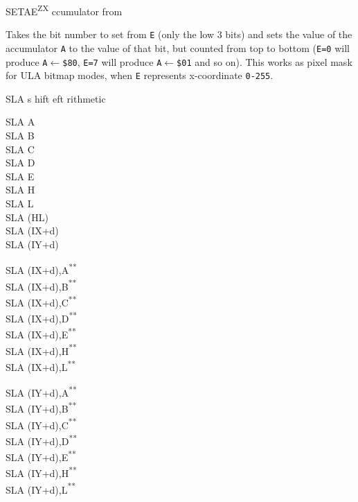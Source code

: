 \documentclass[12pt,twoside,openright,a4paper]{book}
\newcommand{\UNDOC}{\textnormal{\textsuperscript{**}}}
\newcommand{\ZXN}{\textnormal{\textsuperscript{ZX}}}
\begin{document}
\begin{basedescript}{
	\desclabelstyle{\multilinelabel}
	\desclabelwidth{3cm}}
	\begin{DetailItem}{SETAE\ZXN}
		{ ccumulator from }
		{\SymSETAE}

		Takes the bit number to set from {\tt E} (only the low 3 bits) and sets the value of the accumulator {\tt A} to the value of that bit, but counted from top to bottom ({\tt E=0} will produce {\tt A$\leftarrow$\$80}, {\tt E=7} will produce {\tt A$\leftarrow$\$01} and so on). This works as pixel mask for ULA bitmap modes, when {\tt E} represents x-coordinate {\tt 0-255}.

		\DetailNoEffect
						
		\begin{DetailTiming}
		\end{DetailTiming}

	\end{DetailItem}

	\pagebreak
	\begin{DetailItem}{SLA s}
		{hift eft rithmetic}
		{}
		
		\begin{DetailVariants}
			SLA A\\
			SLA B\\
			SLA C\\
			SLA D\\
			SLA E\\
			SLA H\\
			SLA L\\
			SLA (HL)\\
			SLA (IX+d)\\
			SLA (IY+d)

			\columnbreak
			SLA (IX+d),A\UNDOC\\
			SLA (IX+d),B\UNDOC\\
			SLA (IX+d),C\UNDOC\\
			SLA (IX+d),D\UNDOC\\
			SLA (IX+d),E\UNDOC\\
			SLA (IX+d),H\UNDOC\\
			SLA (IX+d),L\UNDOC

			\columnbreak
			SLA (IY+d),A\UNDOC\\
			SLA (IY+d),B\UNDOC\\
			SLA (IY+d),C\UNDOC\\
			SLA (IY+d),D\UNDOC\\
			SLA (IY+d),E\UNDOC\\
			SLA (IY+d),H\UNDOC\\
			SLA (IY+d),L\UNDOC
		\end{DetailVariants}


\end{DetailItem}
\end{basedescript}
\end{document}
